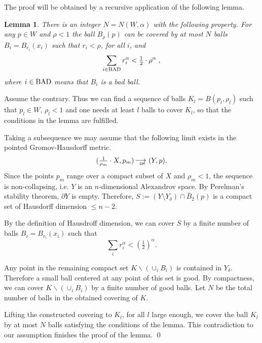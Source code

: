 \documentclass[12pt,leqno]{amsart}
\numberwithin{equation}{section}
\newtheorem{lem}[thm]{Lemma}
\theoremstyle{definition}
\theoremstyle{remark}
\def\BAD{\mathop{\rm BAD}\nolimits}%
\newcommand*{\GHto}{\mathbin{\begin{picture}(16,3.5)
\put(-1,1){$\longrightarrow$}
\put(13,-3){\llap{\text{\sf\tiny GH}}}
\end{picture}}}
\def\parit#1{\medskip\noindent{\it #1}}
\def\qeds{\qed\par\medskip}
\begin{document}
The proof will be obtained by a recursive application of the following lemma.

\begin{lem}\label{lem:covering}
There is an integer $N  =N(W,\alpha) $ with the following property. For any $p\in W$ and $\rho < 1$
the ball $B_{\rho}(p)$ can be covered by at most $N$ balls
 $B_i=B_{r_i}(x_i)$ such that $r_i <\rho$, for all $i$, and
$$ \sum_{i\in \BAD}r_i^{\alpha}< \tfrac12\cdot \rho^{\alpha} \; ,$$
where $i\in \BAD$ means that $B_i$ is a bad ball.
\end{lem}

\parit{Proof.}
Assume the contrary. Thus we can find   a sequence of  balls
$K_l=B(p_l,\rho_l)$
such that $p_l\in W$,
$\rho_l<1$ and
one needs at least $l$ balls to cover $K_l$, so that the conditions in the lemma are fulfilled.

Taking a subsequence we may assume that the following limit exists in the pointed Gromov-Hausdorff metric.
$$(\tfrac1{\rho_m}\cdot X,p_m)\GHto (Y,p).$$
Since the points $p_m$ range over a compact subset of $X$ and   $\rho _m <1$, the
sequence is non-collapsing, i.e. $Y$ is an $n$-dimensional Alexandrov space.
By Perelman's stability theorem, $\partial Y$  is empty.
Therefore,  $S:= (Y\setminus Y_{\delta} ) \cap \bar B_2 (p)$ is a compact set of   Hausdorff dimension $\le n-2$.

By the definition of Hausdroff dimension, we can cover $S$ by a finite number of balls
$B_i=B_{r_i}(x_i)$ such that
$$\sum_ir_i^{\alpha} < (\tfrac12)^{\alpha}.$$


Any point in the remaining compact set $K\backslash (\cup_i B_i)$
is contained  in $Y_{\delta}$. Therefore a small ball centered at any point of this set is good.
By compactness, we can cover $K\backslash (\cup_i B_i)$ by a finite number of good balls.
Let $N$ be the total number of balls in the obtained covering of $K$.

Lifting the constructed covering to $K_l$, for all $l$ large enough,
we cover
the ball $K_l$ by at most $N$ balls satisfying the conditions of the lemma.
This  contradiction to our assumption finishes the proof of the lemma.
\qeds
\end{document}
